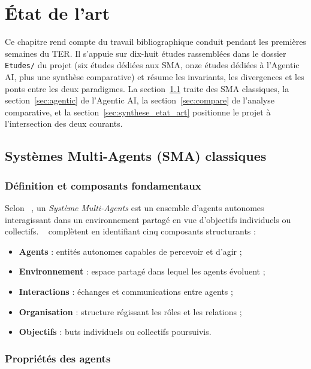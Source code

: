\chapter{État de l'art}
\label{chap:etat_art}

Ce chapitre rend compte du travail bibliographique conduit pendant les premières semaines du TER. Il s'appuie sur dix-huit études rassemblées dans le dossier \texttt{Etudes/} du projet (six études dédiées aux SMA, onze études dédiées à l'Agentic AI, plus une synthèse comparative) et résume les invariants, les divergences et les ponts entre les deux paradigmes. La section~\ref{sec:sma} traite des SMA classiques, la section~\ref{sec:agentic} de l'Agentic AI, la section~\ref{sec:compare} de l'analyse comparative, et la section~\ref{sec:synthese_etat_art} positionne le projet à l'intersection des deux courants.

\section{Systèmes Multi-Agents (SMA) classiques}
\label{sec:sma}

\subsection{Définition et composants fondamentaux}

Selon \citeauthor{dorri2018mas}~\cite{dorri2018mas}, un \emph{Système Multi-Agents} est un ensemble d'agents autonomes interagissant dans un environnement partagé en vue d'objectifs individuels ou collectifs. \citeauthor{sma_systemes}~\cite{sma_systemes} complètent en identifiant cinq composants structurants :

\begin{itemize}[leftmargin=1cm]
\item \textbf{Agents} : entités autonomes capables de percevoir et d'agir ;
\item \textbf{Environnement} : espace partagé dans lequel les agents évoluent ;
\item \textbf{Interactions} : échanges et communications entre agents ;
\item \textbf{Organisation} : structure régissant les rôles et les relations ;
\item \textbf{Objectifs} : buts individuels ou collectifs poursuivis.
\end{itemize}

\subsection{Propriétés des agents}

